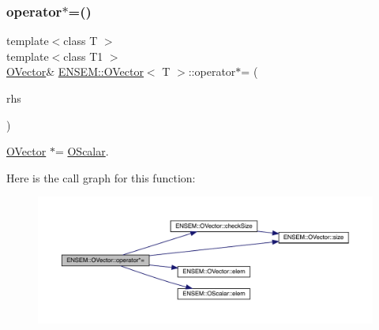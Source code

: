 \subsubsection{\texorpdfstring{operator$\ast$=()}{operator*=()}\hspace{0.1cm}{\footnotesize\ttfamily [1/4]}}
{\footnotesize\ttfamily template$<$class T $>$ \\
template$<$class T1 $>$ \\
\mbox{\hyperlink{classENSEM_1_1OVector}{O\+Vector}}\& \mbox{\hyperlink{classENSEM_1_1OVector}{E\+N\+S\+E\+M\+::\+O\+Vector}}$<$ T $>$\+::operator$\ast$= (\begin{DoxyParamCaption}\item[{const \mbox{\hyperlink{classENSEM_1_1OScalar}{O\+Scalar}}$<$ T1 $>$ \&}]{rhs }\end{DoxyParamCaption})\hspace{0.3cm}{\ttfamily [inline]}}



\mbox{\hyperlink{classENSEM_1_1OVector}{O\+Vector}} $\ast$= \mbox{\hyperlink{classENSEM_1_1OScalar}{O\+Scalar}}. 

Here is the call graph for this function\+:
\nopagebreak
\begin{figure}[H]
\begin{center}
\leavevmode
\includegraphics[width=350pt]{d0/d8d/classENSEM_1_1OVector_a55710cffaf6c877d2465af80ad8b6c49_cgraph}
\end{center}
\end{figure}
\mbox{\label{classENSEM_1_1OVector_a55710cffaf6c877d2465af80ad8b6c49}} 
